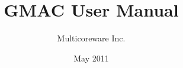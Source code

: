 \documentclass[letterpaper,twoside,final]{memoir}
\begin{document}
\title{GMAC User Manual}
\author{Multicoreware Inc.}
\date{May 2011}
\maketitle

\frontmatter

\tableofcontents
\clearpage
\listoftables
\clearpage
\listoffigures

\mainmatter



\appendix




\backmatter
\printindex
\end{document}
